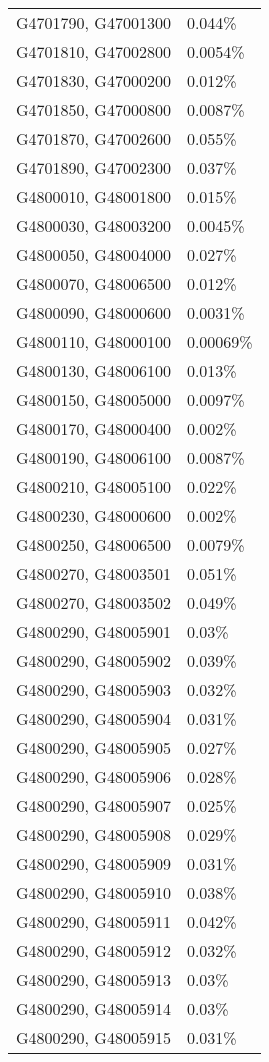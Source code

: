 \begin{longtable}[]{@{}ll@{}}
G4701790, G47001300 & 0.044\% \\
G4701810, G47002800 & 0.0054\% \\
G4701830, G47000200 & 0.012\% \\
G4701850, G47000800 & 0.0087\% \\
G4701870, G47002600 & 0.055\% \\
G4701890, G47002300 & 0.037\% \\
G4800010, G48001800 & 0.015\% \\
G4800030, G48003200 & 0.0045\% \\
G4800050, G48004000 & 0.027\% \\
G4800070, G48006500 & 0.012\% \\
G4800090, G48000600 & 0.0031\% \\
G4800110, G48000100 & 0.00069\% \\
G4800130, G48006100 & 0.013\% \\
G4800150, G48005000 & 0.0097\% \\
G4800170, G48000400 & 0.002\% \\
G4800190, G48006100 & 0.0087\% \\
G4800210, G48005100 & 0.022\% \\
G4800230, G48000600 & 0.002\% \\
G4800250, G48006500 & 0.0079\% \\
G4800270, G48003501 & 0.051\% \\
G4800270, G48003502 & 0.049\% \\
G4800290, G48005901 & 0.03\% \\
G4800290, G48005902 & 0.039\% \\
G4800290, G48005903 & 0.032\% \\
G4800290, G48005904 & 0.031\% \\
G4800290, G48005905 & 0.027\% \\
G4800290, G48005906 & 0.028\% \\
G4800290, G48005907 & 0.025\% \\
G4800290, G48005908 & 0.029\% \\
G4800290, G48005909 & 0.031\% \\
G4800290, G48005910 & 0.038\% \\
G4800290, G48005911 & 0.042\% \\
G4800290, G48005912 & 0.032\% \\
G4800290, G48005913 & 0.03\% \\
G4800290, G48005914 & 0.03\% \\
G4800290, G48005915 & 0.031\% \\

\end{longtable}
